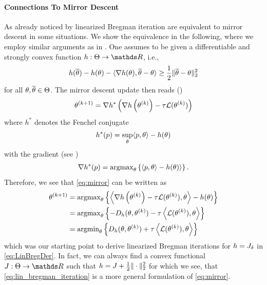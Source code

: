 \paragraph{Connections To Mirror Descent}
As already noticed by \cite{villa2023implicit} linearized Bregman iteration are equivalent to mirror descent in some situations. We show the equivalence in the following, where we employ similar arguments as in \cite{beck2003mirror}.
%
One assumes to be given a differentiable and strongly convex function $h:\Param\to\R$, i.e.,
%
\begin{align*}
h(\overline{\theta}) - h(\theta) - \langle\nabla h(\theta), \overline{\theta} - \theta \rangle \geq  
\frac{1}{2} \|\overline{\theta} - \theta\|^2_2
\end{align*}
%
for all $\theta,\overline{\theta}\in\Theta$. The mirror descent update then reads (\cite{nemirovskij1983problem, beck2003mirror})
%
\begin{align}\label{eq:mirror}
\theta^{(k+1)} = \nabla h^\ast\left(\nabla h\left(\theta^{(k)}\right) - \tau \mathcal{L}(\theta^{(k)})\right)
\end{align}
%
where $h^\ast$ denotes the Fenchel conjugate
%
\begin{align*}
h^\ast(p) = \sup_{\theta} \langle p, \theta\rangle - h(\theta)
\end{align*}
%
with the gradient (see \cite{boyd2004convex})
%
\begin{align*}
\nabla h^\ast(p) = \operatorname{argmax}_{\theta} \left\{ \langle p, \theta\rangle - h(\theta)\rangle\right\}.
\end{align*}
%
Therefore, we see that \cref{eq:mirror} can be written as
%
\begin{align*}
\theta^{(k+1)} &= \operatorname{argmax}_\theta
\left\{\left\langle\nabla h\left(\theta^{(k)}\right) - \tau \mathcal{L}(\theta^{(k)}), \theta \right\rangle - h(\theta)\right\}\\
&=
\operatorname{argmax}_\theta \left\{-D_h(\theta, \theta^{(k)})-\tau\left\langle \mathcal{L}(\theta^{(k)}), \theta \right\rangle\right\}\\
&=
\operatorname{argmin}_\theta \left\{D_h(\theta, \theta^{(k)})+\tau\left\langle \mathcal{L}(\theta^{(k)}), \theta \right\rangle\right\}
\end{align*}
%
which was our starting point to derive linearized Bregman iterations for $h=J_{\delta}$ in \cref{eq:LinBregDer}. In fact, we can always find a convex functional $\func:\Theta\to\R$ such that $h = J + \frac{1}{2}\|\cdot\|_2^2$ for which we see, that \cref{eq:lin_bregman_iteration} is a more general formulation of \cref{eq:mirror}.
%
%
